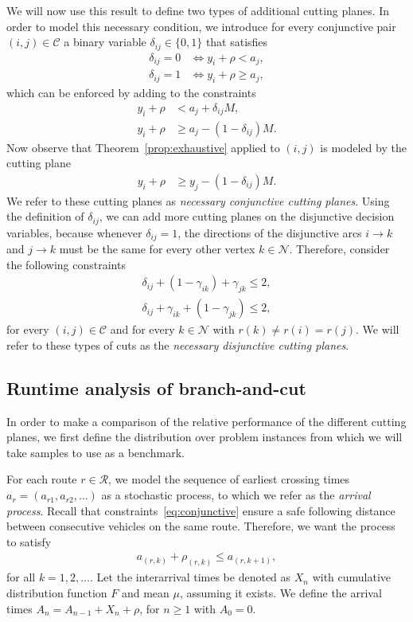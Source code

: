 \documentclass[a4paper]{report}
\theoremstyle{definition}
\theoremstyle{plain}
\begin{document}
We will now use this result to define two types of additional cutting planes. In
order to model this necessary condition, we introduce for every conjunctive pair
$(i,j) \in \mathcal{C}$ a binary variable $\delta_{ij} \in \{0, 1\}$ that satisfies
\begin{align*}
  \delta_{ij} = 0 &\iff y_{i} + \rho < a_{j} , \\
  \delta_{ij} = 1 &\iff y_{i} + \rho \geq a_{j} ,
\end{align*}
which can be enforced by adding to the constraints
\begin{align*}
  y_{i} + \rho &< a_{j} + \delta_{ij}M , \\
  y_{i} + \rho &\geq a_{j} - (1 - \delta_{ij}) M .
\end{align*}
Now observe that Theorem~\ref{prop:exhaustive} applied to $(i,j)$ is modeled by the
cutting plane
\begin{align*}
  y_{i} + \rho &\geq y_{j} - (1 - \delta_{ij}) M .
\end{align*}
We refer to these cutting planes as \textit{necessary conjunctive cutting planes}.
%
Using the definition of $\delta_{ij}$, we can add more cutting planes on the
disjunctive decision variables, because whenever $\delta_{ij} = 1$, the directions of
the disjunctive arcs $i \rightarrow k$ and $j \rightarrow k$ must be the same for every other vertex
$k \in \mathcal{N}$. Therefore, consider the following constraints
\begin{align*}
  \delta_{ij} + (1 - \gamma_{ik}) + \gamma_{jk} \leq 2 , \\
  \delta_{ij} + \gamma_{ik} + (1 - \gamma_{jk}) \leq 2 ,
\end{align*}
for every $(i,j) \in \mathcal{C}$ and for every $k \in \mathcal{N}$ with $r(k) \neq r(i) = r(j)$.
We will refer to these types of cuts as the \textit{necessary disjunctive cutting planes}.

\subsection{Runtime analysis of branch-and-cut}
\label{sec:runtime}

In order to make a comparison of the relative performance of the different
cutting planes, we first define the distribution over problem instances from
which we will take samples to use as a benchmark.

For each route $r \in \mathcal{R}$, we model the sequence of earliest crossing times
$a_{r} = (a_{r1}, a_{r2}, \dots)$ as a stochastic process, to which we refer as
the \textit{arrival process}. Recall that constraints~\eqref{eq:conjunctive}
ensure a safe following distance between consecutive vehicles on the same route.
Therefore, we want the process to satisfy
\begin{align*}
  a_{(r, k)} + \rho_{(r,k)} \leq a_{(r, k + 1)} ,
\end{align*}
for all $k = 1, 2, \dots$.
%
Let the interarrival times be denoted as $X_{n}$ with cumulative distribution
function $F$ and mean $\mu$, assuming it exists. We define the arrival times
$A_{n} = A_{n-1} + X_{n} + \rho$, for $n \geq 1$ with $A_{0} = 0$.
\end{document}
